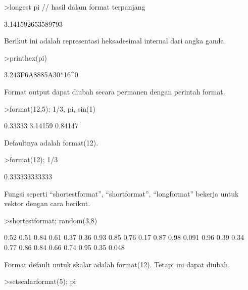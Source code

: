 \documentclass[a4paper,10pt]{article}
\begin{document}
\begin{eulernotebook}
\begin{eulerprompt}
>longest pi // hasil dalam format terpanjang
\end{eulerprompt}
\begin{euleroutput}
        3.141592653589793 
\end{euleroutput}
\begin{eulercomment}
Berikut ini adalah representasi heksadesimal internal dari angka
ganda.
\end{eulercomment}
\begin{eulerprompt}
>printhex(pi)
\end{eulerprompt}
\begin{euleroutput}
  3.243F6A8885A30*16^0
\end{euleroutput}
\begin{eulercomment}
Format output dapat diubah secara permanen dengan perintah format.
\end{eulercomment}
\begin{eulerprompt}
>format(12,5); 1/3, pi, sin(1)
\end{eulerprompt}
\begin{euleroutput}
      0.33333 
      3.14159 
      0.84147 
\end{euleroutput}
\begin{eulercomment}
Defaultnya adalah format(12).
\end{eulercomment}
\begin{eulerprompt}
>format(12); 1/3
\end{eulerprompt}
\begin{euleroutput}
  0.333333333333
\end{euleroutput}
\begin{eulercomment}
Fungsi seperti “shortestformat”, “shortformat”, “longformat” bekerja
untuk vektor dengan cara berikut.
\end{eulercomment}
\begin{eulerprompt}
>shortestformat; random(3,8)
\end{eulerprompt}
\begin{euleroutput}
    0.52   0.51   0.84   0.61   0.37   0.36   0.93   0.85 
    0.76   0.17   0.87   0.98  0.091   0.96   0.39   0.34 
    0.77   0.86   0.84   0.66   0.74   0.95   0.35  0.048 
\end{euleroutput}
\begin{eulercomment}
Format default untuk skalar adalah format(12). Tetapi ini dapat
diubah.
\end{eulercomment}
\begin{eulerprompt}
>setscalarformat(5); pi
\end{eulerprompt}

\end{eulernotebook}
\end{document}
